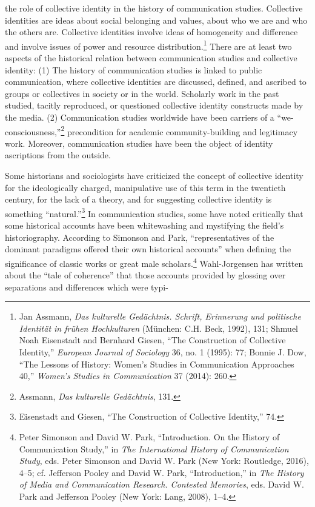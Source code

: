\documentclass{tufte-handout}
\begin{document}
\begin{titlepage}
 the role of collective identity in the history of
communication studies. Collective identities are ideas about social
belonging and values, about who we are and who the others are.
Collective identities involve ideas of homogeneity and difference and
involve issues of power and resource
distribution.\footnote{Jan Assmann, \emph{Das kulturelle Gedächtnis. Schrift, Erinnerung und
  politische Identität in frühen Hochkulturen} (München: C.H. Beck,
  1992), 131; Shmuel Noah Eisenstadt and Bernhard Giesen, ``The
  Construction of Collective Identity,'' \emph{European Journal of
  Sociology} 36, no. 1 (1995): 77; Bonnie J. Dow, ``The Lessons of
  History: Women's Studies in Communication Approaches 40,''
  \emph{Women's Studies in Communication} 37 (2014): 260.
} There are at least
two aspects of the historical relation between communication studies and
collective identity: (1) The history of communication studies is linked
to public communication, where collective identities are discussed,
defined, and ascribed to groups or collectives in society or in the
world. Scholarly work in the past studied, tacitly reproduced, or
questioned collective identity constructs made by the media. (2)
Communication studies worldwide have been carriers of a
``we-consciousness,''\footnote{Assmann, \emph{Das kulturelle Gedächtnis}, 131.
} precondition
for academic community-building and legitimacy work. Moreover,
communication studies have been the object of identity ascriptions from
the outside.

Some historians and sociologists have criticized the concept of
collective identity for the ideologically charged, manipulative use of
this term in the twentieth century, for the lack of a theory, and for
suggesting collective identity is something
``natural.''\footnote{Eisenstadt and Giesen, ``The Construction of Collective Identity,''
  74.
} In communication
studies, some have noted critically that some historical accounts have
been whitewashing and mystifying the field's historiography. According
to Simonson and Park, ``representatives of the dominant paradigms
offered their own historical accounts'' when defining the significance
of classic works or great male
scholars.\footnote{Peter Simonson and David W. Park, ``Introduction. On the History of
  Communication Study,'' in \emph{The International History of
  Communication Study}, eds. Peter Simonson and David W. Park (New York:
  Routledge, 2016), 4--5; cf. Jefferson Pooley and David W. Park,
  ``Introduction,'' in \emph{The History of Media and Communication
  Research. Contested Memories}, eds. David W. Park and Jefferson Pooley
  (New York: Lang, 2008), 1--4.
} Wahl-Jorgensen has
written about the ``tale of coherence'' that those accounts provided by
glossing over separations and differences which were typi-

\enlargethispage{2\baselineskip}

\vspace*{2em}





 \end{titlepage}
\end{document}
